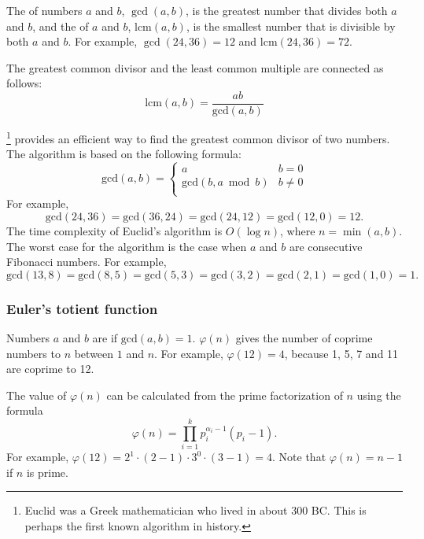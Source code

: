 
The  of
numbers $a$ and $b$, $\gcd(a,b)$,
is the greatest number that divides both $a$ and $b$,
and the  of
$a$ and $b$, $\textrm{lcm}(a,b)$,
is the smallest number that is divisible by
both $a$ and $b$.
For example,
$\gcd(24,36)=12$ and
$\textrm{lcm}(24,36)=72$.

The greatest common divisor and the least common multiple
are connected as follows:
\[\textrm{lcm}(a,b)=\frac{ab}{\textrm{gcd}(a,b)}\]

\footnote{Euclid was a Greek mathematician who
lived in about 300 BC. This is perhaps the first known algorithm in history.} provides an efficient way
to find the greatest common divisor of two numbers.
The algorithm is based on the following formula:
\begin{equation*}
    \textrm{gcd}(a,b) = \begin{cases}
               a        & b = 0\\
               \textrm{gcd}(b,a \bmod b) & b \neq 0\\
           \end{cases}
\end{equation*}
For example,
\[\textrm{gcd}(24,36) = \textrm{gcd}(36,24)
= \textrm{gcd}(24,12) = \textrm{gcd}(12,0)=12.\]
The time complexity of Euclid's algorithm
is $O(\log n)$, where $n=\min(a,b)$.
The worst case for the algorithm is
the case when $a$ and $b$ are consecutive Fibonacci numbers.
For example,
\[\textrm{gcd}(13,8)=\textrm{gcd}(8,5)
=\textrm{gcd}(5,3)=\textrm{gcd}(3,2)=\textrm{gcd}(2,1)=\textrm{gcd}(1,0)=1.\]

\subsubsection{Euler's totient function}


Numbers $a$ and $b$ are 
if $\textrm{gcd}(a,b)=1$.
 $\varphi(n)$
gives the number of coprime numbers to $n$
between $1$ and $n$.
For example, $\varphi(12)=4$,
because 1, 5, 7 and 11
are coprime to 12.

The value of $\varphi(n)$ can be calculated
from the prime factorization of $n$
using the formula
\[ \varphi(n) = \prod_{i=1}^k p_i^{\alpha_i-1}(p_i-1). \]
For example, $\varphi(12)=2^1 \cdot (2-1) \cdot 3^0 \cdot (3-1)=4$.
Note that $\varphi(n)=n-1$ if $n$ is prime.

